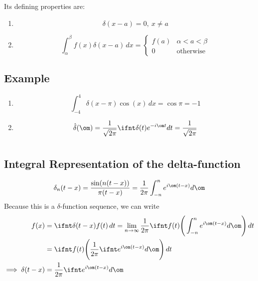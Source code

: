 \documentclass[a4paper, 11pt, normalem]{report}
\begin{document}
Its defining properties are:
\begin{enumerate}
    \item   \begin{equation*}
                \delta(x - a) = 0,~ x \neq a
            \end{equation*}
    \item   \begin{equation*}
                \int_{\alpha}^{\beta} f(x)\delta(x - a)\,dx =
                \begin{cases}
                    f(a) & \alpha < a < \beta \\
                    0 & \text{otherwise}
                \end{cases}
            \end{equation*}
\end{enumerate}

\section{Example}
\begin{enumerate}
    \item   \begin{equation*}
                \int_{-4}^{4} \delta(x - \pi)\cos(x)\,dx = \cos\pi = -1
            \end{equation*}
    \item   \begin{equation*}
                \hat{\delta}(\om) = \frac{1}{\sqrt{2\pi}} \ifnt \delta(t)e^{-i\om t}dt = \frac{1}{\sqrt{2\pi}}
            \end{equation*}
\end{enumerate}

\chapter{}
\section{Integral Representation of the delta-function}
\begin{equation*}
    \delta_n (t - x) = \frac{\sin(n(t - x))}{\pi(t - x)} = \frac{1}{2\pi} \int_{-n}^{n} e^{i\om(t - x)}d\om
\end{equation*}
Because this is a $\delta$-function sequence, we can write
\begin{align*}
    f(x) &= \ifnt \delta(t - x)f(t)\,dt = \lim_{n \to \infty} \frac{1}{2\pi} \ifnt f(t) \Bigg(\int_{-n}^{n} e^{i\om(t - x)}d\om\Bigg)\,dt \\
    &= \ifnt f(t)\Bigg(\frac{1}{2\pi} \ifnt e^{i\om(t - x)} d\om\Bigg)\,dt \\
    \implies \delta(t - x) &= \frac{1}{2\pi} \ifnt e^{i\om(t - x)} d\om
\end{align*}
\end{document}

